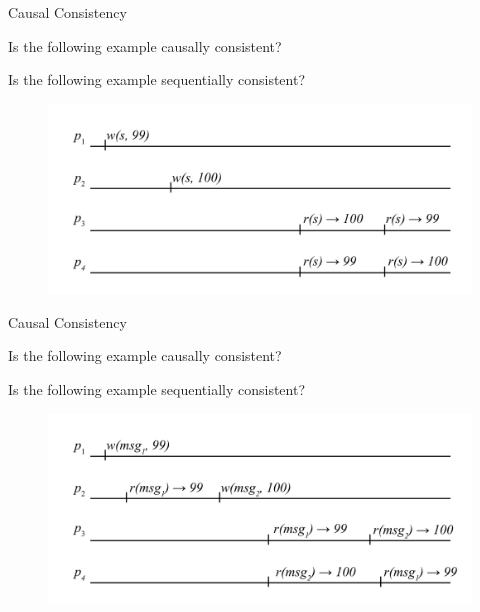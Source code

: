 \begin{frame}{Causal Consistency}
	
\begin{example}
\BI
\item Is the following example causally consistent? 
\item Is the following example sequentially consistent?	
\EI
\end{example}	
	
\begin{figure}
\includegraphics[width=\textwidth]{figs/09/scenario3}
\end{figure}


\end{frame}

\begin{frame}{Causal Consistency}
	
\begin{example}
\BI
\item Is the following example causally consistent? 
\item Is the following example sequentially consistent?	
\EI
\end{example}	
	
\begin{figure}
\includegraphics[width=\textwidth]{figs/09/scenario4}
\end{figure}


\end{frame}



